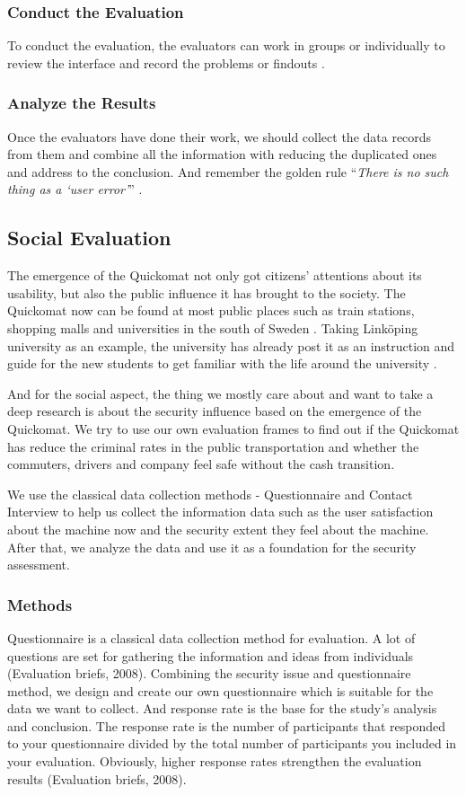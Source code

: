 \documentclass[twocolumn]{article}
\begin{document}
\subsubsection{Conduct the Evaluation}
To conduct the evaluation, the evaluators can work in groups or individually to review the interface and record the problems or findouts \citep{Danino2001}.

\subsubsection{Analyze the Results}
Once the evaluators have done their work, we should collect the data records from them and combine all the information with reducing the duplicated ones and address to the conclusion. And remember the golden rule “\emph{There is no such thing as a ‘user error’}” \citep{Danino2001}.

\subsection{Social Evaluation}
The emergence of the Quickomat not only got citizens’ attentions about its usability, but also the public influence it has brought to the society. The Quickomat now can be found at most public places such as train stations, shopping malls and universities in the south of Sweden \citep{QuickomatAB2014}. Taking Linköping university as an example, the university has already post it as an instruction and guide for the new students to get familiar with the life around the university \citep{Liu2014}. 

And for the social aspect, the thing we mostly care about and want to take a deep research is about the security influence based on the emergence of the Quickomat. We try to use our own evaluation frames to find out if the Quickomat has reduce the criminal rates in the public transportation and whether the commuters, drivers and company feel safe without the cash transition. 

We use the classical data collection methods - Questionnaire and Contact Interview to help us collect the information data such as the user satisfaction about the machine now and the security extent they feel about the machine.
After that, we analyze the data and use it as a foundation for the security assessment.

\subsubsection{Methods}
Questionnaire is a classical data collection method for evaluation. A lot of questions are set for gathering the information and ideas from individuals (Evaluation briefs, 2008). Combining the security issue and questionnaire method, we design and create our own questionnaire which is suitable for the data we want to collect. And response rate is the base for the study’s analysis and conclusion. The response rate is the number of participants that responded to your questionnaire divided by the total number of participants you included in your evaluation. Obviously, higher response rates strengthen the evaluation results (Evaluation briefs, 2008). 
\end{document}
